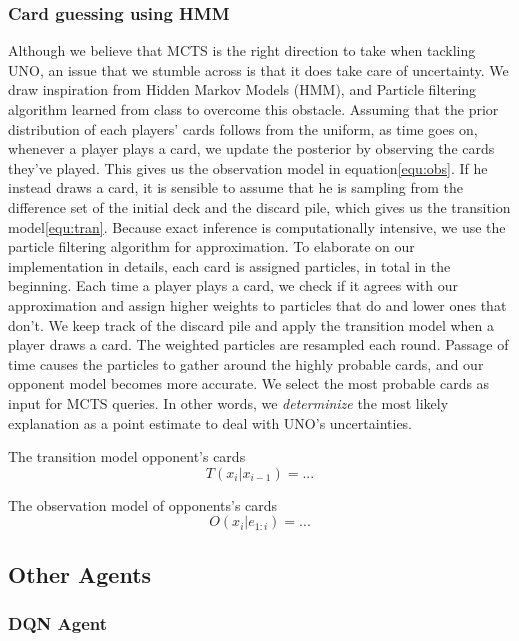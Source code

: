 \documentclass{article}
\begin{document}
\subsubsection{Card guessing using HMM}
Although we believe that MCTS is the right direction to take when tackling UNO, an issue that we stumble across is that it does take care of uncertainty. We draw inspiration from Hidden Markov Models (HMM), and Particle filtering algorithm learned from class to overcome this obstacle. Assuming that the prior distribution of each players' cards follows from the uniform, as time goes on, whenever a player plays a card, we update the posterior by observing the cards they've played. This gives us the observation model in equation\ref{equ:obs}. If he instead draws a card, it is sensible to assume that he is sampling from the difference set of the initial deck and the discard pile, which gives us the transition model\ref{equ:tran}. Because exact inference is computationally intensive, we use the particle filtering algorithm for approximation. To elaborate on our implementation in details, each card is assigned \todo{} particles, \todo{} in total in the beginning. Each time a player plays a card, we check if it agrees with our approximation and assign higher weights to particles that do and lower ones that don't. We keep track of the discard pile and apply the transition model when a player draws a card. The weighted particles are resampled each round. Passage of time causes the particles to gather around the highly probable cards, and our opponent model becomes more accurate. We select the most probable cards as input for MCTS queries. In other words, we \textit{determinize} the most likely explanation as a point estimate to deal with UNO's uncertainties.


The transition model opponent's cards
\begin{equation}
    T(x_i|x_{i-1}) = ...
    \label{equ:tran}
\end{equation}

The observation model of opponents's cards
\begin{equation}
    O(x_i|e_{1:i}) = ...
    \label{equ:obs}
\end{equation}

\subsection{Other Agents}
\subsubsection{DQN Agent}
\end{document}
